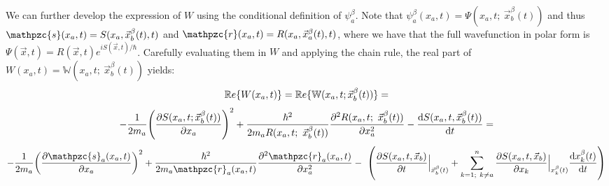 \documentclass[11pt, a4paper]{article} %
\newcommand{\R}{\mathbb{R}} %
\newcommand{\z}{\mathpzc{s}}
\newcommand{\p}{\mathpzc{r}}
\newcommand{\W}{\mathbb{W}}
\begin{document}
We can further develop the expression of $W$ using the conditional definition of $\psi_a^\beta$. Note that $\psi_a^\beta ( x_a, t) = \Psi(x_a,t; \ \vec{x}_b^\beta(t))$ and thus $\z(x_a,t)=S(x_a, \vec{x}_b^\beta(t),t)$ and $\p (x_a,t)=R(x_a, \vec{x}_a^\beta (t),t)$, where we have that the full wavefunction in polar form is $\Psi(\vec{x},t)=R(\vec{x},t)e^{iS(\vec{x},t)/\hbar}$. Carefully evaluating them in $W$ and applying the chain rule, the real part of $W(x_a,t)=\W(x_a,t;\ \vec{x}_b^\beta(t))$ yields:
$$
\R e\{W(x_a,t)\}=\R e\{\W(x_a,t; \vec{x}_b^\beta(t))\}=\vspace{-0.12cm}
$$
$$
-\frac{1}{2m_a} \qty(\pdv{S(x_a,t;\vec{x}_b^\beta(t))}{x_a})^2 +\frac{\hbar^2}{2m_aR(x_a,t;\ \vec{x}_b^\beta(t))}\pdv[2]{R(x_a, t; \ \vec{x}_b^\beta(t))}{x_a}-\dv{S(x_a,t,\vec{x}_b^\beta(t))}{t}=\vspace{-0.1cm}
$$
$$
-\frac{1}{2m_a} \qty(\pdv{\z_a(x_a,t)}{x_a})^2 +\frac{\hbar^2}{2m_a\p_a(x_a,t)}\pdv[2]{\p_a(x_a, t)}{x_a}- \ \qty(\pdv{S(x_a,t,\vec{x}_b)}{t}\Big\rvert_{\vec{x}_b^\beta(t)}+\sum_{k=1;\ k\neq a}^n \pdv{S(x_a,t,\vec{x}_b)}{x_k}\Big\rvert_{x_k^\beta(t)} \dv{x_k^\beta(t)}{t})\vspace{-0.12cm}
$$
\end{document}
